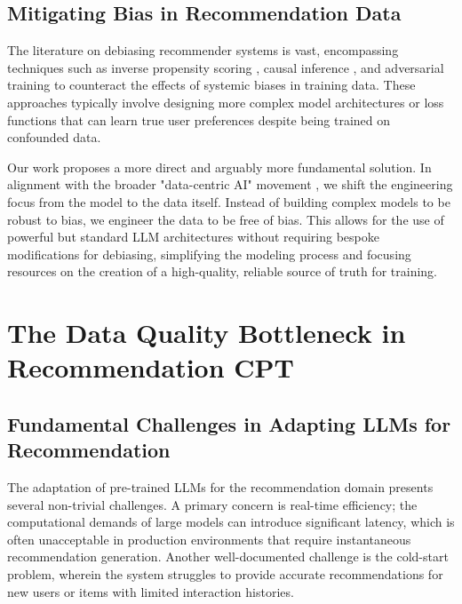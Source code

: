 \documentclass[]{fairmeta}
\newcommand{\jh}[1]{\iftoggle{comment}{\textcolor{orange}{[JH: #1]}}{}}
\begin{document}
\subsection{Mitigating Bias in Recommendation Data}
The literature on debiasing recommender systems is vast, encompassing techniques such as inverse propensity scoring \cite{cardoso2022brsnisbiasreducedselfnormalized, agarwalEstimatingPositionBias2019, wangPositionBiasEstimation2018, Hu_2025}, causal inference \cite{pan2025counterfactualinferenceeliminatingsentiment, li2023stabledr}, and adversarial training \cite{yangAdversarialRegularizedDiffusion2025, feng2019learningfairrepresentationsadversarial, Hu_2023} to counteract the effects of systemic biases in training data. These approaches typically involve designing more complex model architectures or loss functions that can learn true user preferences despite being trained on confounded data.

Our work proposes a more direct and arguably more fundamental solution. In alignment with the broader "data-centric AI" movement \cite{zha2023datacentricartificialintelligencesurvey, angelakis2024datacentricapproachclassspecificbias}, we shift the engineering focus from the model to the data itself. Instead of building complex models to be robust to bias, we engineer the data to be free of bias. This allows for the use of powerful but standard LLM architectures without requiring bespoke modifications for debiasing, simplifying the modeling process and focusing resources on the creation of a high-quality, reliable source of truth for training. 
\section{The Data Quality Bottleneck in Recommendation CPT}
\subsection{Fundamental Challenges in Adapting LLMs for Recommendation}
The adaptation of pre-trained LLMs for the recommendation domain presents several non-trivial challenges. A primary concern is real-time efficiency; the computational demands of large models can introduce significant latency, which is often unacceptable in production environments that require instantaneous recommendation generation. Another well-documented challenge is the cold-start problem, wherein the system struggles to provide accurate recommendations for new users or items with limited interaction histories.
\end{document}
